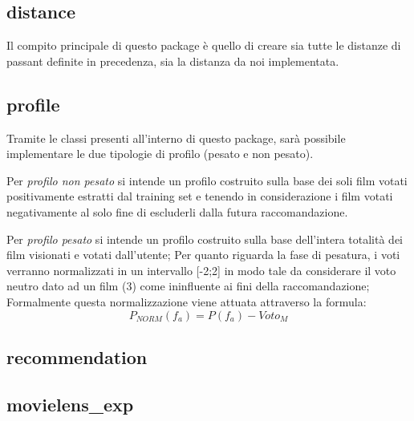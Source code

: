\subsection{distance}
Il compito principale di questo package è quello di creare sia tutte le distanze di passant definite in precedenza, sia la distanza da noi implementata.
\subsection{profile}
Tramite le classi presenti all'interno di questo package, sarà possibile implementare le due tipologie di profilo (pesato e non pesato).

Per \emph{profilo non pesato} si intende un profilo costruito sulla base dei soli film votati positivamente estratti dal training set e tenendo in considerazione i film votati negativamente al solo fine di escluderli dalla futura raccomandazione.

Per \emph{profilo pesato} si intende un profilo costruito sulla base dell'intera totalità dei film visionati e votati dall'utente; Per quanto riguarda la fase di pesatura, i voti verranno normalizzati in un intervallo [-2;2] in modo tale da considerare il voto neutro dato ad un film (3) come ininfluente ai fini della raccomandazione; Formalmente questa normalizzazione viene attuata attraverso la formula:
$$
P_{NORM}(f_a) = P(f_a)- Voto_M
$$ 
\subsection{recommendation}

\subsection{movielens\_exp}
